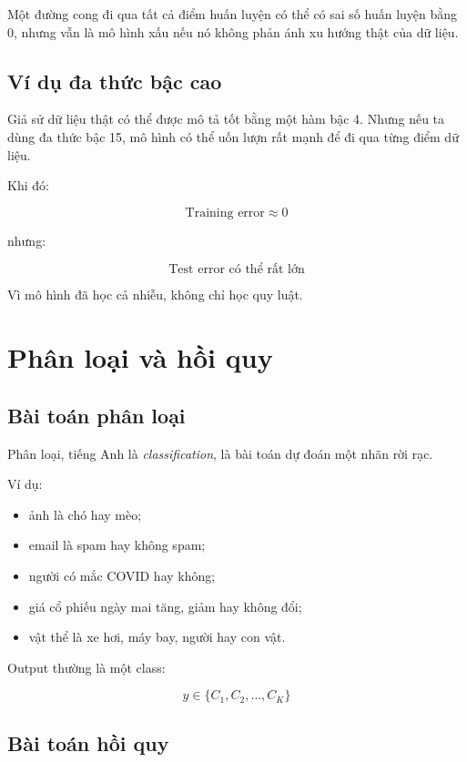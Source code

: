 \begin{canhbao}
Một đường cong đi qua tất cả điểm huấn luyện có thể có sai số huấn luyện bằng 0, nhưng vẫn là mô hình xấu nếu nó không phản ánh xu hướng thật của dữ liệu.
\end{canhbao}

\subsection{Ví dụ đa thức bậc cao}

Giả sử dữ liệu thật có thể được mô tả tốt bằng một hàm bậc 4. Nhưng nếu ta dùng đa thức bậc 15, mô hình có thể uốn lượn rất mạnh để đi qua từng điểm dữ liệu.

Khi đó:

\[
    \text{Training error} \approx 0
\]

nhưng:

\[
    \text{Test error} \text{ có thể rất lớn}
\]

Vì mô hình đã học cả nhiễu, không chỉ học quy luật.

\section{Phân loại và hồi quy}

\subsection{Bài toán phân loại}

Phân loại, tiếng Anh là \textit{classification}, là bài toán dự đoán một nhãn rời rạc.

Ví dụ:

\begin{itemize}
    \item ảnh là chó hay mèo;
    \item email là spam hay không spam;
    \item người có mắc COVID hay không;
    \item giá cổ phiếu ngày mai tăng, giảm hay không đổi;
    \item vật thể là xe hơi, máy bay, người hay con vật.
\end{itemize}

Output thường là một class:

\[
    y \in \{C_1,C_2,\ldots,C_K\}
\]

\subsection{Bài toán hồi quy}

